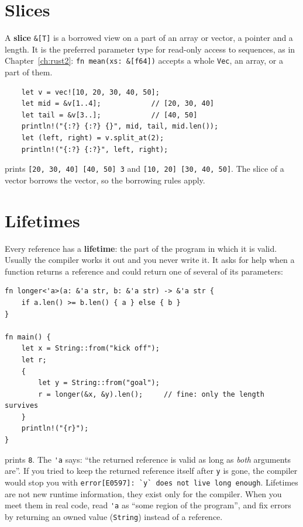 \section*{Slices}
A \textbf{slice} \verb!&[T]! is a borrowed view on a part of an array or vector, a pointer and a length. It is the preferred parameter type for read-only access to sequences, as in Chapter~\ref{ch:rust2}: \verb!fn mean(xs: &[f64])! accepts a whole \verb!Vec!, an array, or a part of them.
\begin{verbatim}
    let v = vec![10, 20, 30, 40, 50];
    let mid = &v[1..4];            // [20, 30, 40]
    let tail = &v[3..];            // [40, 50]
    println!("{:?} {:?} {}", mid, tail, mid.len());
    let (left, right) = v.split_at(2);
    println!("{:?} {:?}", left, right);
\end{verbatim}
prints \verb![20, 30, 40] [40, 50] 3! and \verb![10, 20] [30, 40, 50]!. The slice of a vector borrows the vector, so the borrowing rules apply.

\section*{Lifetimes}
Every reference has a \textbf{lifetime}: the part of the program in which it is valid. Usually the compiler works it out and you never write it. It asks for help when a function returns a reference and could return one of several of its parameters:
\begin{verbatim}
fn longer<'a>(a: &'a str, b: &'a str) -> &'a str {
    if a.len() >= b.len() { a } else { b }
}

fn main() {
    let x = String::from("kick off");
    let r;
    {
        let y = String::from("goal");
        r = longer(&x, &y).len();     // fine: only the length survives
    }
    println!("{r}");
}
\end{verbatim}
prints \verb!8!. The \verb!'a! says: ``the returned reference is valid as long as \emph{both} arguments are''. If you tried to keep the returned reference itself after \verb!y! is gone, the compiler would stop you with \verb!error[E0597]: `y` does not live long enough!. Lifetimes are not new runtime information, they exist only for the compiler. When you meet them in real code, read \verb!'a! as ``some region of the program'', and fix errors by returning an owned value (\verb!String!) instead of a reference.

